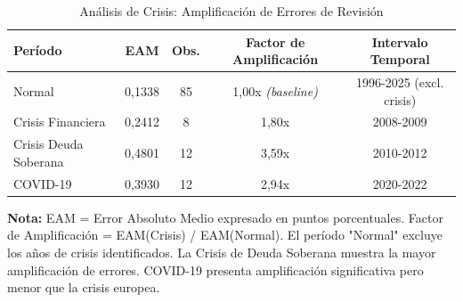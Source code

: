 \begin{table}[h!]
\centering
\caption{Análisis de Crisis: Amplificación de Errores de Revisión}
\label{tab:analisis_crisis_v3}
\begin{threeparttable}
\begin{tabular}{lcccc}
\toprule
\textbf{Período} & \textbf{EAM} & \textbf{Obs.} & \textbf{Factor de Amplificación} & \textbf{Intervalo Temporal} \\
\midrule
Normal & 0,1338 & 85 & 1,00x \textit{(baseline)} & 1996-2025 (excl. crisis) \\
Crisis Financiera & 0,2412 & 8 & 1,80x & 2008-2009 \\
Crisis Deuda Soberana & 0,4801 & 12 & 3,59x & 2010-2012 \\
COVID-19 & 0,3930 & 12 & 2,94x & 2020-2022 \\
\bottomrule
\end{tabular}
\begin{tablenotes}
\footnotesize
\item \textbf{Nota:} EAM = Error Absoluto Medio expresado en puntos porcentuales. Factor de Amplificación = EAM(Crisis) / EAM(Normal). El período "Normal" excluye los años de crisis identificados. La Crisis de Deuda Soberana muestra la mayor amplificación de errores. COVID-19 presenta amplificación significativa pero menor que la crisis europea.
\end{tablenotes}
\end{threeparttable}
\end{table}